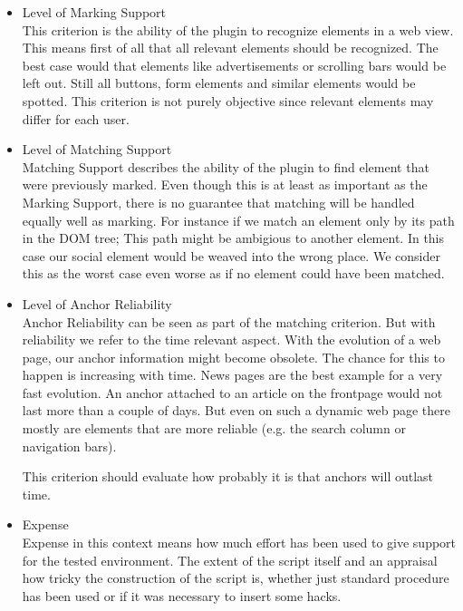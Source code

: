 \begin{itemize}
	\item Level of Marking Support \\
	This criterion is the ability of the plugin to recognize elements in a web view. This means first of all that all relevant elements should be recognized. The best case would that elements like advertisements or scrolling bars would be left out. Still all buttons, form elements and similar elements would be spotted. This criterion is not purely objective since relevant elements may differ for each user.
	
	\item Level of Matching Support \\	
	Matching Support describes the ability of the plugin to find element that were previously marked. Even though this is at least as important as the Marking Support, there is no guarantee that matching will be handled equally well as marking. For instance if we match an element only by its path in the DOM tree; This path might be ambigious to another element. In this case our social element would be weaved into the wrong place. We consider this as the worst case even worse as if no element could have been matched.
 
	\item Level of Anchor Reliability \\
	Anchor Reliability can be seen as part of the matching criterion. But with reliability we refer to the time relevant aspect. With the evolution of a web page, our anchor information might become obsolete. The chance for this to happen is increasing with time. News pages are the best example for a very fast evolution. An anchor attached to an article on the frontpage would not last more than a couple of days. But even on such a dynamic web page there mostly are elements that are more reliable (e.g. the search column or navigation bars). 
	
	This criterion should evaluate how probably it is that anchors will outlast time. 
	
	\item Expense \\
	Expense in this context means how much effort has been used to give support for the tested environment. The extent of the script itself and an appraisal how tricky the construction of the script is, whether just standard procedure has been used or if it was necessary to insert some hacks. 
		
\end{itemize}